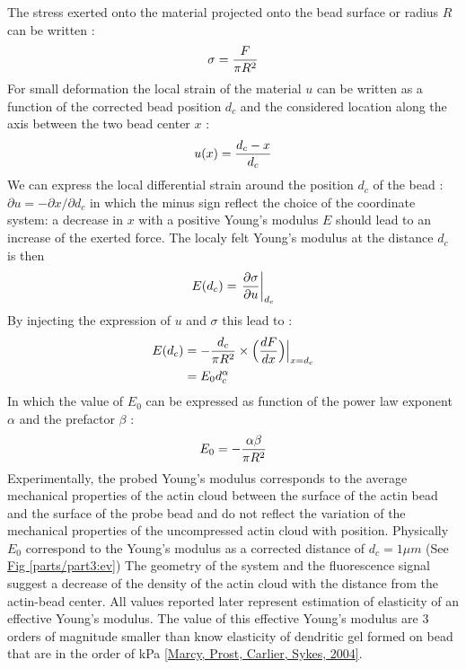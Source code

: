 \documentclass[A4paperpaper,11pt,english]{sphinxmanual}
\begin{document}
The stress exerted onto the material projected onto the bead surface or radius
\(R\) can be written :
\begin{gather}
\begin{split}\sigma = \frac{F}{\pi R^2}\end{split}\notag
\end{gather}
For small deformation the local strain of the material \(u\) can be written
as a function of the corrected bead position \(d_c\) and the considered location
along the axis between the two bead center \(x\) :
\begin{gather}
\begin{split}u(x)= \frac{d_c-x}{d_c}\end{split}\notag
\end{gather}
We can express the local differential strain around the position \(d_c\) of the
bead : \(\partial u = -\partial x/ \partial d_c\) in which the minus sign
reflect the choice of the coordinate system: a decrease in \(x\) with a
positive Young's modulus \(E\) should lead to an increase of the exerted force.
The localy felt Young's modulus
at the distance \(d_c\) is then
\label{parts/part3:eq-e}\begin{gather}
\begin{split}E(d_c) = \left.\frac{\partial\sigma}{\partial u}\right|_{d_c}\end{split}\notag
\end{gather}
By injecting the expression of \(u\) and \(\sigma\) this lead to :
\begin{gather}
\begin{split}E(d_c) &= -\frac{d_c}{\pi R^2}\times \Big(\frac{dF}{dx}\Big) \Big|_{x=d_c}\\
     &= E_0 d_c^\alpha\end{split}\notag
\end{gather}
In which the value of \(E_0\) can be expressed as function of the power law exponent \(\alpha\) and the prefactor \(\beta\) :
\begin{gather}
\begin{split}E_0 = - \frac{\alpha\beta}{\pi R^2}\end{split}\notag
\end{gather}
Experimentally, the probed Young's modulus corresponds to the average mechanical
properties of the actin cloud between the surface of the actin bead and the
surface of the probe bead and do not reflect the variation of the mechanical
properties of the uncompressed actin cloud with position.
Physically \(E_0\) correspond to the Young's modulus as a corrected distance of \(d_c = 1 \mu{}m\)
(See \hyperref[parts/part3:ev]{Fig  \ref*{parts/part3:ev}})
The geometry of the
system and the fluorescence signal suggest a decrease of the density of the
actin cloud with the distance from the actin-bead center. All values
reported later represent estimation of elasticity of an effective Young's
modulus. The value of this effective Young's modulus are 3 orders of magnitude
smaller than know elasticity of dendritic gel formed on bead that are in the
order of kPa {\hyperref[parts/part3:marcy2004]{{[}Marcy, Prost, Carlier, Sykes,  2004{]}}}.
\end{document}
